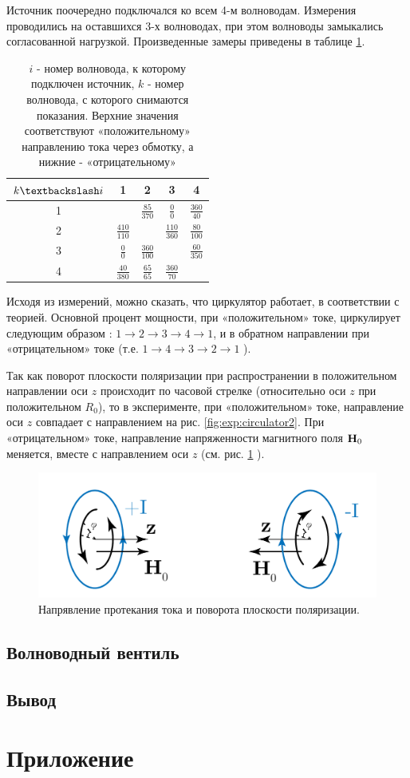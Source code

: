 Источник поочередно подключался ко всем 4-м волноводам. Измерения проводились
на оставшихся 3-х волноводах, при этом волноводы замыкались согласованной
нагрузкой. Произведенные замеры приведены в таблице \ref{tab:faradey}.
 \begin{table}[h!]
    \centering
    \begin{tabular}{|c|c|c|c|c|}
    \hline
     $k \textbackslash i$ & 1 & 2 & 3 & 4 \\ \hline
    1 & \cellcolor{black!70}  & $\frac{85}{370}$ & $\frac{0}{0}$& $\frac{360}{40}$  \\ \hline
    2 & $\frac{410}{110}$  &\cellcolor{black!70}   & $\frac{110}{360}$  & $\frac{80}{100}$  \\ \hline
    3 & $\frac{0}{0}$  & $\frac{360}{100}$  & \cellcolor{black!70}  &  $\frac{60}{350}$ \\ \hline
    4 & $\frac{40}{380}$  & $\frac{65}{65}$  & $\frac{360}{70}$  & \cellcolor{black!70} \\ \hline
    \end{tabular}
    \caption{$i$ - номер волновода, к которому подключен источник, $k$ - номер волновода, с которого снимаются
    показания. Верхние значения соответствуют «положительному» направлению тока через обмотку, а нижние - «отрицательному»}
    \label{tab:faradey}
    \end{table}

Исходя из измерений, можно сказать, что циркулятор работает, в соответствии с теорией. Основной процент мощности, при
«положительном» токе, циркулирует следующим образом : $1 \rightarrow 2 \rightarrow 3 \rightarrow 4 \rightarrow 1$, и
в обратном направлении при «отрицательном» токе (т.е. $1 \rightarrow 4 \rightarrow 3 \rightarrow 2 \rightarrow 1$ ).

Так как поворот плоскости поляризации при распространении в положительном направлении оси $z$ происходит по часовой
стрелке (относительно оси $z$ при положительном $R_0$), то в эксперименте, при «положительном» токе, направление оси $z$ совпадает с
направлением на рис. \ref{fig:exp:circulator2}. При «отрицательном» токе, направление напряженности магнитного поля
$\textbf{H}_0$ меняется, вместе с направлением оси $z$ (см. рис. \ref{fig:exp:circulator3} ).
\begin{figure}[h!]
    \centering
    \includegraphics[width = 0.7\linewidth]{imgs/circulator3.pdf}
    \caption{Напрявление протекания тока и поворота плоскости поляризации.}
    \label{fig:exp:circulator3}
\end{figure}
\subsection{Волноводный вентиль}

\subsection{Вывод}

\newpage
\section{Приложение}

